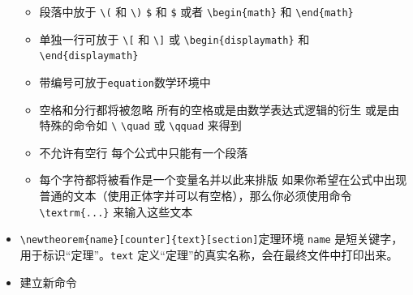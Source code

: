 \documentclass[
]{book}
\begin{document}
\begin{itemize}
  \begin{itemize}
  \item
    段落中放于 \texttt{\textbackslash{}(} 和 \texttt{\textbackslash{})} \texttt{\$} 和 \texttt{\$} 或者 \texttt{\textbackslash{}begin\{math\}} 和 \texttt{\textbackslash{}end\{math\}}
  \item
    单独一行可放于 \texttt{\textbackslash{}{[}} 和 \texttt{\textbackslash{}{]}} 或 \texttt{\textbackslash{}begin\{displaymath\}} 和 \texttt{\textbackslash{}end\{displaymath\}}
  \item
    带编号可放于\texttt{equation}数学环境中
  \item
    空格和分行都将被忽略 所有的空格或是由数学表达式逻辑的衍生 或是由特殊的命令如 \texttt{\textbackslash{}} \texttt{\textbackslash{}quad} 或 \texttt{\textbackslash{}qquad} 来得到
  \item
    不允许有空行 每个公式中只能有一个段落
  \item
    每个字符都将被看作是一个变量名并以此来排版 如果你希望在公式中出现普通的文本（使用正体字并可以有空格），那么你必须使用命令 \texttt{\textbackslash{}textrm\{...\}} 来输入这些文本
  \end{itemize}
\item
  \texttt{\textbackslash{}newtheorem\{name\}{[}counter{]}\{text\}{[}section{]}}定理环境 \texttt{name} 是短关键字，用于标识``定理''。\texttt{text} 定义``定理''的真实名称，会在最终文件中打印出来。
\item
  建立新命令


\end{itemize}
\end{document}
